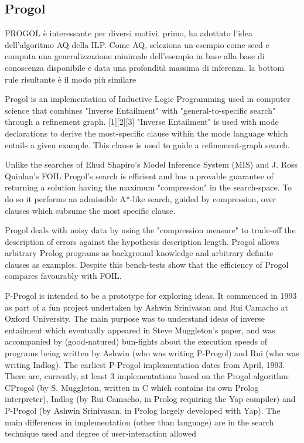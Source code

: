 \subsection{Progol}

PROGOL è interessante per diversi motivi. primo, ha adottato l'idea dell'algoritmo AQ della ILP. Come AQ, seleziona un esempio come seed e computa una generalizzazione minimale dell'esempio in base alla base di conoscenza disponibile e data una profondità massima di inferenza. la bottom rule risultante è il modo più similare 


Progol is an implementation of Inductive Logic Programming used in computer science that combines "Inverse Entailment" with "general-to-specific search" through a refinement graph. [1][2][3] "Inverse Entailment" is used with mode declarations to derive the most-specific clause within the mode language which entails a given example. This clause is used to guide a refinement-graph search.

Unlike the searches of Ehud Shapiro's Model Inference System (MIS) and J. Ross Quinlan's FOIL Progol's search is efficient and has a provable guarantee of returning a solution having the maximum "compression" in the search-space. To do so it performs an admissible A*-like search, guided by compression, over clauses which subsume the most specific clause.

Progol deals with noisy data by using the "compression measure" to trade-off the description of errors against the hypothesis description length. Progol allows arbitrary Prolog programs as background knowledge and arbitrary definite clauses as examples. Despite this bench-tests show that the efficiency of Progol compares favourably with FOIL.
\nocite{wiki:progol}

P-Progol is intended to be a prototype for exploring ideas. It commenced in 1993 as part of a fun project undertaken by Ashwin Srinivasan and Rui Camacho at Oxford University. The main purpose was to understand ideas of inverse entailment which eventually appeared in Steve Muggleton's paper, and was accompanied by (good-natured) bun-fights about the execution speeds of programs being written by Ashwin (who was writing P-Progol) and Rui (who was writing Indlog). The earliest P-Progol implementation dates from April, 1993. There are, currently, at least 3 implementations based on the Progol algorithm: CProgol (by S. Muggleton, written in C which contains its own Prolog interpreter), Indlog (by Rui Camacho, in Prolog requiring the Yap compiler) and P-Progol (by Ashwin Srinivasan, in Prolog largely developed with Yap). The main differences in implementation (other than language) are in the search technique used and degree of user-interaction allowed

